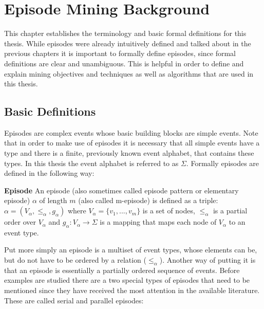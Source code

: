 \chapter{Episode Mining Background}
\label{chapter_background}

\ifpdf
    \graphicspath{{Chapter3/Figs/Raster/}{Chapter3/Figs/PDF/}{Chapter3/Figs/}}
\else
    \graphicspath{{Chapter3/Figs/Vector/}{Chapter3/Figs/}}
\fi

This chapter establishes the terminology and basic formal definitions for this thesis. While episodes were already intuitively defined and talked about in the previous chapters it is important to formally define episodes, since formal definitions are clear and unambiguous. This is helpful in order to define and explain mining objectives and techniques as well as algorithms that are used in this thesis. 

\section{Basic Definitions}
\label{sec_basicEpisodeDefinitions}
Episodes are complex events whose basic building blocks are simple events. Note that in order to make use of episodes it is necessary that all simple events have a type and there is a finite, previously known event alphabet, that contains these types. In this thesis the event alphabet is referred to as $\Sigma$. Formally episodes are defined in the following way:

\begin{mydef}
\label{def_episode}
\textbf{Episode} An episode (also sometimes called episode pattern or elementary episode) $\alpha$ of length $m$ (also called m-episode) is defined as a triple: $\alpha = (V_\alpha,{\leq}_{\alpha},g_\alpha)$ where $V_\alpha = \{v_1,...,v_m\}$ is a set of nodes, ${\leq}_{\alpha}$ is a partial order over $V_\alpha$ and $g_\alpha : V_\alpha \rightarrow \Sigma$ is a mapping that maps each node of $V_\alpha$ to an event type. \cite{mannila1995discovering}
\end{mydef}

Put more simply an episode is a multiset of event types, whose elements can be, but do not have to be ordered by a relation (${\leq}_{\alpha}$). Another way of putting it is that an episode is essentially a partially ordered sequence of events. Before examples are studied there are a two special types of episodes that need to be mentioned since they have received the most attention in the available literature. These are called serial and parallel episodes:

